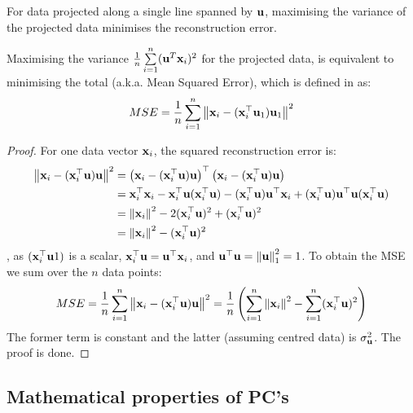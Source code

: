 \documentclass[a4paper]{article}
\begin{document}
For data projected along a single line spanned by $\textbf{u}$, maximising the variance of the projected data minimises the reconstruction error.

\begin{lemma} Maximising the variance $\frac{1}{n}\sum\limits_{i=1}^{n}(\textbf{u}^T\textbf{x}_i)^2$ for the projected data,  is equivalent to minimising the total  (a.k.a. Mean Squared Error), which is defined in as:
\begin{equation*}
    MSE = \frac{1}{n}\sum\limits_{i=1}^{n}\left\lVert\textbf{x}_i - (\textbf{x}_i^{\top}\textbf{u}_1)\textbf{u}_1\right\rVert^2
\end{equation*}
\end{lemma}
\begin{proof}
For one data vector $\textbf{x}_i$, the squared reconstruction error is:
\begin{align*}
   \left\lVert\textbf{x}_i - (\textbf{x}_i^{\top}\textbf{u})\textbf{u}\right\rVert^2 
   &= \left(\textbf{x}_i - (\textbf{x}_i^{\top}\textbf{u})\textbf{u}\right)^{\top} \left(\textbf{x}_i - (\textbf{x}_i^{\top}\textbf{u})\textbf{u}\right) \\
   &= \textbf{x}_i^{\top}\textbf{x}_i - \textbf{x}_i^{\top}\textbf{u}(\textbf{x}_i^{\top}\textbf{u}) - (\textbf{x}_i^{\top}\textbf{u})\textbf{u}^{\top}\textbf{x}_i + (\textbf{x}_i^{\top}\textbf{u})\textbf{u}^{\top}\textbf{u}(\textbf{x}_i^{\top}\textbf{u}) \\
   &= \left\lVert\textbf{x}_i\right\rVert^2 - 2(\textbf{x}_i^{\top}\textbf{u})^2 + (\textbf{x}_i^{\top}\textbf{u})^2 \\
   &= \left\lVert\textbf{x}_i\right\rVert^2 - (\textbf{x}_i^{\top}\textbf{u})^2
\end{align*}
, as $(\textbf{x}_i^{\top}\textbf{u}1)$ is a scalar, $\textbf{x}_i^{\top}\textbf{u} = \textbf{u}^{\top} \textbf{x}_i$, and $\textbf{u}^{\top}\textbf{u} = \left\lVert\textbf{u}\right\rVert_1^2 = 1$. To obtain the MSE  we sum over the $n$ data points:
\[
    MSE = \frac{1}{n} \sum\limits_{i=1}^n\left\lVert\textbf{x}_i - (\textbf{x}_i^{\top}\textbf{u})\textbf{u}\right\rVert^2  = \frac{1}{n}\left(\sum\limits_{i=1}^n\left\lVert\textbf{x}_i\right\rVert^2 - \sum\limits_{i=1}^n (\textbf{x}_i^{\top}\textbf{u})^2\right)
\]
The former term is constant and the latter (assuming centred data) is $\sigma_{\textbf{u}}^2$. The proof is done.
\end{proof}








\subsection{Mathematical properties of PC's}
\end{document}
